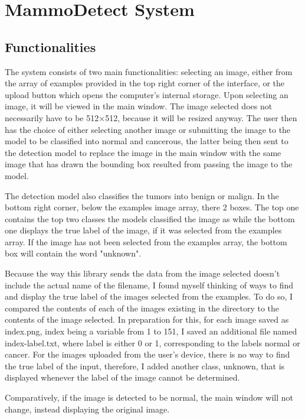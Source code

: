 \chapter{MammoDetect System}
\label{chap:ch5}

\section{Functionalities}
The system consists of two main functionalities: selecting an image, either from the array of examples provided in the top right corner of the interface, or the upload button which opens the computer's internal storage. Upon selecting an image, it will be viewed in the main window. The image selected does not necessarily have to be 512$\times$512, because it will be resized anyway. The user then has the choice of either selecting another image or submitting the image to the model to be classified into normal and cancerous, the latter being then sent to the detection model to replace the image in the main window with the same image that has drawn the bounding box resulted from passing the image to the model. 

The detection model also classifies the tumors into benign or malign. In the bottom right corner, below the examples image array, there 2 boxes. The top one contains the top two classes the models classified the image as while the bottom one displays the true label of the image, if it was selected from the examples array. If the image has not been selected from the examples array, the bottom box will contain the word "unknown".

Because the way this library sends the data from the image selected doesn't include the actual name of the filename, I found myself thinking of ways to find and display the true label of the images selected from the examples. To do so, I compared the contents of each of the images existing in the directory to the contents of the image selected. In preparation for this, for each image saved as index.png, index being a variable from 1 to 151, I saved an additional file named index-label.txt, where label is either 0 or 1, corresponding to the labels normal or cancer. For the images uploaded from the user's device, there is no way to find the true label of the input, therefore, I added another class, unknown, that is displayed whenever the label of the image cannot be determined.

Comparatively, if the image is detected to be normal, the main window will not change, instead displaying the original image.

